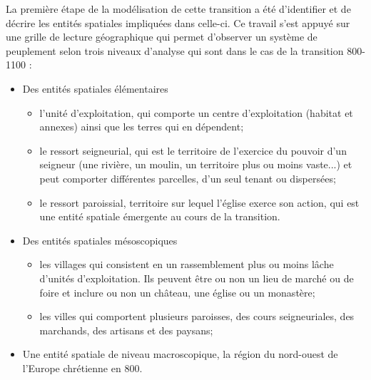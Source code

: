 \documentclass[12pt, a4paper, oneside]{book}
\begin{document}
	La première étape de la modélisation de cette transition a été d'identifier et de décrire les entités spatiales impliquées dans celle-ci.
	Ce travail s'est appuyé sur une grille de lecture géographique qui permet d'observer un système de peuplement selon trois niveaux d'analyse qui sont dans le cas de la transition 800-1100 :
	\begin{itemize}
		\item Des entités spatiales élémentaires
		\begin{itemize}
			\item l'unité d'exploitation, qui comporte un centre d'exploitation (habitat et	annexes) ainsi que les terres qui en dépendent;
			\item le ressort seigneurial, qui est le territoire de l'exercice du pouvoir d'un	seigneur (une rivière, un moulin, un territoire plus ou moins vaste...) et peut comporter différentes parcelles, d'un seul tenant ou dispersées;
			\item le ressort paroissial, territoire sur lequel l'église exerce son action, qui est une entité spatiale émergente au cours de la transition.
		\end{itemize} 
		
		\item Des entités spatiales mésoscopiques
		\begin{itemize}
			\item 	les villages qui consistent en un rassemblement plus ou moins lâche d'unités d'exploitation. Ils peuvent être ou non un lieu de marché ou de foire et inclure ou non un château, une église ou un monastère;
			\item les villes qui comportent plusieurs paroisses, des cours seigneuriales, des marchands, des artisans et des paysans;
		\end{itemize}
		
		\item Une entité spatiale de niveau macroscopique, la région du nord-ouest de l'Europe chrétienne en 800.
	\end{itemize}
	
\end{document}

